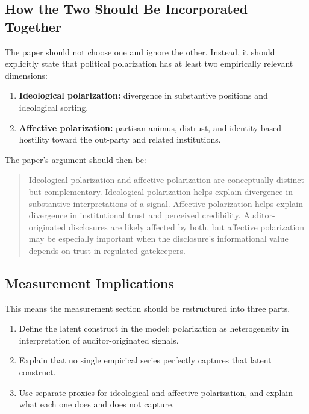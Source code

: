 \documentclass[12pt]{article}
\begin{document}
\subsection{How the Two Should Be Incorporated Together}

The paper should not choose one and ignore the other. Instead, it should explicitly state that political polarization has at least two empirically relevant dimensions:

\begin{enumerate}[label=\textbf{P\arabic*.}]
    \item \textbf{Ideological polarization:} divergence in substantive positions and ideological sorting.
    \item \textbf{Affective polarization:} partisan animus, distrust, and identity-based hostility toward the out-party and related institutions.
\end{enumerate}

The paper's argument should then be:

\begin{quote}
Ideological polarization and affective polarization are conceptually distinct but complementary. Ideological polarization helps explain divergence in substantive interpretations of a signal. Affective polarization helps explain divergence in institutional trust and perceived credibility. Auditor-originated disclosures are likely affected by both, but affective polarization may be especially important when the disclosure's informational value depends on trust in regulated gatekeepers.
\end{quote}

\subsection{Measurement Implications}

This means the measurement section should be restructured into three parts.

\begin{enumerate}[label=\textbf{Step \arabic*.}]
    \item Define the latent construct in the model: polarization as heterogeneity in interpretation of auditor-originated signals.
    \item Explain that no single empirical series perfectly captures that latent construct.
    \item Use separate proxies for ideological and affective polarization, and explain what each one does and does not capture.
\end{enumerate}
\end{document}
